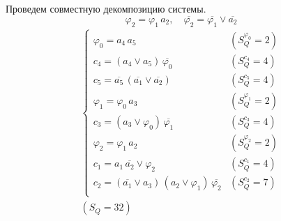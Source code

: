 \documentclass{article}
\begin{document}
\noindent\begin{minipage}{\textwidth}
Проведем совместную декомпозицию системы. \[\varphi_{2} = \varphi_{1}\,a_2, \quad \overline{\varphi_{2}} = \overline{\varphi_{1}} \lor \overline{a_2}\]
\[\begin{matrix}
    \begin{cases}
        \varphi_{0} = a_4\,a_5 & (S_Q^{\varphi_{0}} = 2) \\
        c_4 = \left(a_4 \lor a_5\right)\,\overline{\varphi_{0}} & (S_Q^{c_4} = 4) \\
        c_5 = \overline{a_5}\,\left(\overline{a_1} \lor \overline{a_2}\right) & (S_Q^{c_5} = 4) \\
        \varphi_{1} = \varphi_{0}\,a_3 & (S_Q^{\varphi_{1}} = 2) \\
        c_3 = \left(a_3 \lor \varphi_{0}\right)\,\overline{\varphi_{1}} & (S_Q^{c_3} = 4) \\
        \varphi_{2} = \varphi_{1}\,a_2 & (S_Q^{\varphi_{2}} = 2) \\
        c_1 = a_1\,\overline{a_2} \lor \varphi_{2} & (S_Q^{c_1} = 4) \\
        c_2 = \left(\overline{a_1} \lor a_3\right)\,\left(a_2 \lor \varphi_{1}\right)\,\overline{\varphi_{2}} & (S_Q^{c_2} = 7) \\
    \end{cases} \\ (S_Q = 32)
\end{matrix}\] \\ \phantom{0}
\end{minipage}
\clearpage
\end{document}
